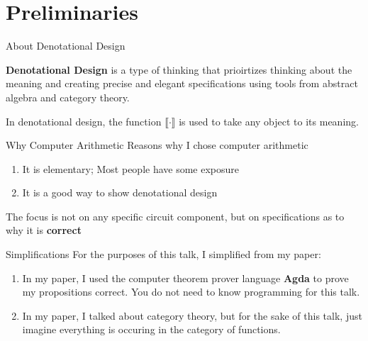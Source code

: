 \documentclass[aspectratio=169]{beamer}
\begin{document}
\begin{center}
\maketitle
{}
\end{center}
\section{Preliminaries}
\begin{frame}{About Denotational Design}

  \begin{defn}
    \textbf{Denotational Design} is a type of thinking that prioirtizes thinking about the meaning and creating precise and elegant specifications using tools from abstract algebra and category theory.
\end{defn}

\begin{notn}
  In denotational design, the function $\llbracket \cdot \rrbracket$ is used to take any object to its meaning.
\end{notn}
\end{frame}

\begin{frame}{Why Computer Arithmetic}
  Reasons why I chose computer arithmetic
  \begin{enumerate}
          \pause \item It is elementary; Most people have some exposure
          \pause \item It is a good way to show denotational design
    \end{enumerate}
    \pause The focus is not on any specific circuit component, but on specifications as to why it is \textbf{correct}
\end{frame}

\begin{frame}{Simplifications}
  For the purposes of this talk, I simplified from my paper:
  \begin{enumerate}
          \pause \item In my paper, I used the computer theorem prover language \textbf{Agda} to prove my propositions correct. You do not need to know programming for this talk.
          \pause \item In my paper, I talked about category theory, but for the sake of this talk, just imagine everything is occuring in the category of functions.
        \end{enumerate}
\end{frame}
\end{document}
